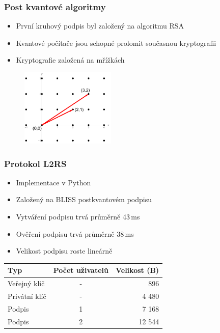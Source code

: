 \documentclass[%
  12pt,       				%
	t,                  %
	aspectratio=1610,   %
	unicode,						%
]{beamer}				    	%
\begin{document}
\begin{frame}
	\frametitle{Post kvantové algoritmy}
    \large{
    \begin{itemize}
        \item První kruhový podpis byl založený na algoritmu RSA
        \item Kvantové počítače jsou schopné prolomit současnou kryptografii
        \item Kryptografie založená na mřížkách
    \end{itemize}
    \begin{figure}[htbp]
      \centering
      \includegraphics[width=0.4\textwidth]{img/mrizky.png}
      
  
    \end{figure}
    }	
\end{frame}

\begin{frame}
	\frametitle{Protokol L2RS}
    \large{
    \begin{itemize}
        \item Implementace v Python
        \item Založený na BLISS postkvantovém podpisu
        \item Vytváření podpisu trvá průměrně 43\,ms
        \item Ověření podpisu trvá průměrně 38\,ms
        \item Velikost podpisu roste lineárně 
    \end{itemize}
    }	
    \begin{table}[htbp]
  \centering

  \begin{tabular}{|l|c|r|}
    \hline
    Typ              & Počet uživatelů & Velikost (B) \\
    \hline
    Veřejný klíč     & -               & 896         \\
    Privátní klíč    & -               & 4 480        \\
    Podpis           & 1               & 7 168        \\
    Podpis           & 2               & 12 544       \\
    \hline
  \end{tabular}
  \label{sizes}
\end{table}

\end{frame}
\end{document}

